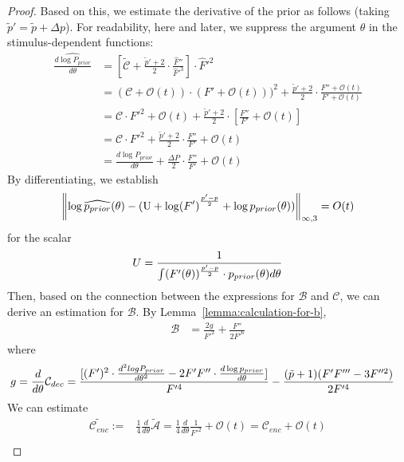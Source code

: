 \begin{proof}
    
Based on this, we estimate the derivative of the prior as follows (taking $\tilde{p}' = \tilde{p} + \Delta p$). For readability, here and later, we suppress the argument $\theta$ in the stimulus-dependent functions:
\begin{align*}
        \widehat{\frac{d \log P_{prior}}{d \theta}} &= [\tilde{\mathcal{C}} + \frac{\tilde{p}'+2}{2} \cdot \frac{\widehat{F}''}{\widehat{F}'^3}] \cdot \widehat{F}'^2\\
    &= (\mathcal{C}+\mathcal{O}(t)) \cdot (F' + \mathcal{O}(t)))^2 + \frac{\tilde{p}'+2}{2} \cdot \frac{F'' + \mathcal{O}(t)}{F' + \mathcal{O}(t)} \\
    &= \mathcal{C} \cdot F'^2 + \mathcal{O}(t) + \frac{\tilde{p}'+2}{2} \cdot [\frac{F''}{F'} + \mathcal{O}(t)]\\
    &= \mathcal{C} \cdot F'^2 + \frac{\tilde{p}'+2}{2} \cdot \frac{F''}{F'} + \mathcal{O}(t) \\
    &= \frac{d \log P_{prior}}{d \theta} + \frac{\Delta P}{2} \cdot \frac{F''}{F'} + \mathcal{O}(t)
\end{align*}
%
By differentiating, we establish
\begin{equation}
    \left\|\log \widehat{p_{prior}}(\theta) - (\mathrm{U} + \log (F')^{\frac{p'-p}{2}}  + \log p_{prior}(\theta))\right\|_{\infty,3} = O(t)
\end{equation}
for the scalar
\begin{equation}
    U = \frac{1}{\int (F'(\theta))^{\frac{p'-p}{2}} \cdot p_{prior}(\theta) d\theta }
\end{equation}
    Then, based on the connection between the expressions for $\mathcal{B}$ and $\mathcal{C}$, we can derive an estimation for $\mathcal{B}$. By Lemma~\ref{lemma:calculation-for-b},
    \begin{align*}
        \mathcal{B} &= \frac{2g}{F'^2} + \frac{F''}{2F'^6}
        \end{align*}
        where
        \begin{align*}
        g &= \frac{d}{d\theta} \mathcal{C}_{dec} = \frac{[(F')^2 \cdot \frac{d^2 logP_{prior}}{d \theta^2} - 2F'F'' \cdot \frac{d \log p_{prior}}{d \theta}]}{F'^4} - \frac{(\tilde{p}+1)(F'F''' - 3F''^2)}{2F'^4}
        \end{align*}
We can estimate
\begin{align*}
\tilde{\mathcal{C}_{enc}} := & \frac{1}{4} \frac{d}{d\theta} \tilde{\mathcal{A}} = \frac{1}{4} \frac{d}{d\theta} \frac{1}{F'^2} + \mathcal{O}(t) = \mathcal{C}_{enc} + \mathcal{O}(t)
\\

\end{align*}
\end{proof}
